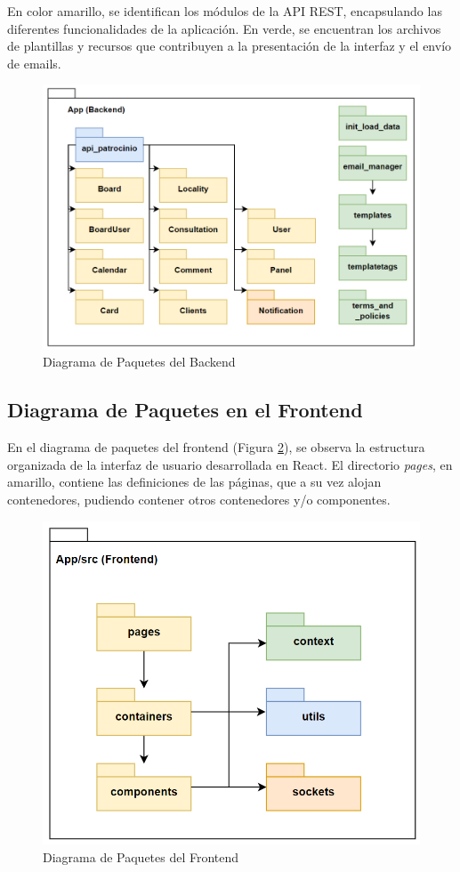 En color amarillo, se identifican los módulos de la API REST, encapsulando las diferentes funcionalidades de la aplicación. En verde, se encuentran los archivos de plantillas y recursos que contribuyen a la presentación de la interfaz y el envío de emails.

\begin{figure}[H]
\centering
\includegraphics[width=0.80\linewidth]{fig/paquete-backend.png}
\caption{Diagrama de Paquetes del Backend}
\label{fig:backend-packages}
\end{figure}

\subsection{Diagrama de Paquetes en el Frontend}

En el diagrama de paquetes del frontend (Figura \ref{fig:frontend-packages}), se observa la estructura organizada de la interfaz de usuario desarrollada en React. El directorio \textit{pages}, en amarillo, contiene las definiciones de las páginas, que a su vez alojan contenedores, pudiendo contener otros contenedores y/o componentes.

\begin{figure}[H]
\centering
\includegraphics[width=0.65\linewidth]{fig/paquete-frontend.png}
\caption{Diagrama de Paquetes del Frontend}
\label{fig:frontend-packages}
\end{figure}

